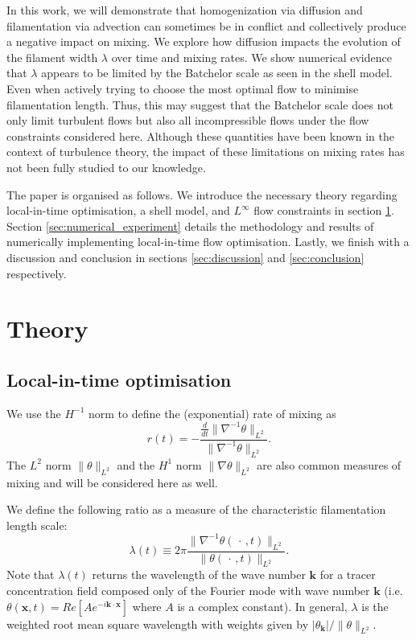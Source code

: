 \documentclass[12pt]{iopart}
\newcommand{\ddt}[1]{\frac{d #1}{dt}}
\newcommand{\hmone}[1]{\|\nabla^{-1} #1\|_{L^{2}}}
\newcommand{\ltwo}[1]{\|#1\|_{L^{2}}}
\newcommand{\hone}[1]{\| \nabla #1\|_{L^{2}}}
\renewcommand{\vec}[1]{\mathbf{#1}}
\begin{document}
%
% 
% 

In this work, we will demonstrate that homogenization via diffusion and filamentation via advection can sometimes be in conflict and collectively produce a negative impact on mixing. We explore how diffusion impacts the evolution of the filament width $\lambda$ over time and mixing rates. We show numerical evidence that $\lambda$ appears to be limited by the Batchelor scale as seen in the shell model. Even when actively trying to choose the most optimal flow to minimise filamentation length. Thus, this may suggest that the Batchelor scale does not only limit turbulent flows but also all incompressible flows under the flow constraints considered here. Although these quantities have been known in the context of turbulence theory, the impact of these limitations on mixing rates has not been fully studied to our knowledge.


The paper is organised as follows. We introduce the necessary theory regarding local-in-time optimisation, a shell model, and $L^{\infty}$ flow constraints in section \ref{sec:theory}. Section \ref{sec:numerical_experiment} details the methodology and results of numerically implementing local-in-time flow optimisation. Lastly, we finish with a discussion and conclusion in sections \ref{sec:discussion} and \ref{sec:conclusion} respectively.





\section{Theory}
\label{sec:theory}
\subsection{Local-in-time optimisation}

We use the $H^{-1}$ norm to define the (exponential) rate of mixing as
\begin{equation}
\label{eq:rate}
r(t) = -  \frac{\ddt{}\hmone{\theta}}{\hmone{\theta}}.
\end{equation}
The $L^{2}$ norm $\ltwo{\theta}$ and the $H^{1}$ norm $\hone{\theta}$ are also common measures of mixing and will be considered here as well. 

We define the following ratio as a measure of the characteristic filamentation length scale:
\begin{equation}
\lambda(t)\equiv  2\pi \frac{\|\nabla^{-1}\theta(\,\cdot\,,t)\|_{L^{2}}}{\|\theta(\,\cdot\,,t)\|_{L^{2}}}.
\end{equation}
Note that $\lambda(t)$ returns the wavelength of the wave number $\vec{k}$ for a tracer concentration field composed only of the Fourier mode with wave number $\vec{k}$ (i.e. $\theta(\vec{x},t) = Re[ A e^{-i\vec{k}\cdot \vec{x}}]$ where $A$ is a complex constant). In general, $\lambda$ is the weighted root mean square wavelength with weights given by $|\theta_{\vec{k}}|/\ltwo{\theta}$. 
\end{document}
